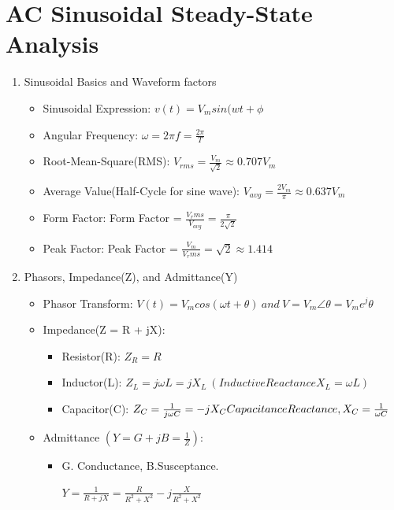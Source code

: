 \documentclass{article}
\begin{document}
\section{AC Sinusoidal Steady-State Analysis}
\begin{enumerate}
    \item Sinusoidal Basics and Waveform factors
    \begin{itemize}
        \item Sinusoidal Expression: $ v(t) = V_msin(wt + \phi$
        \item Angular Frequency: $ \omega = 2\pi f = \frac{2\pi}{T}$
        \item Root-Mean-Square(RMS): $ V_{rms} = \frac{V_m}{\sqrt{2}}\approx0.707V_m$
        \item Average Value(Half-Cycle for sine wave): $ V_{avg} = \frac{2V_m}{\pi}\approx0.637V_m$
        \item Form Factor: Form Factor = $ \frac{V_rms}{V_{avg}}=\frac{\pi}{2\sqrt{2}}$
        \item Peak Factor: Peak Factor = $\frac{V_m}{V_rms} = \sqrt{2} \approx1.414$
    \end{itemize}
    \item Phasors, Impedance(Z), and Admittance(Y)
    \begin{itemize}
        \item Phasor Transform: $ V(t) = V_mcos(\omega t + \theta) \ and\ V = V_m\angle\theta = V_me^j\theta$
        \item Impedance(Z = R + jX):
        \begin{itemize}
            \item Resistor(R): $ Z_R = R$
            \item Inductor(L): $ Z_L = j\omega L = jX_L \ (Inductive Reactance X_L = \omega L)$
            \item Capacitor(C): $ Z_C = \frac{1}{j\omega C} = -jX_C \\ Capacitance Reactance, X_C = \frac{1}{\omega C}$
        \end{itemize}
        \item Admittance $(Y = G + jB = \frac{1}{Z})$:
        \begin{itemize}
            \item G. Conductance, B.Susceptance.
            \begin{center}
                $ Y = \frac{1}{R + jX} = \frac{R}{R^2 + X^2}-j\frac{X}{R^2 + X^2}$
            \end{center}
        \end{itemize}
            

\end{itemize}
\end{enumerate}
\end{document}
